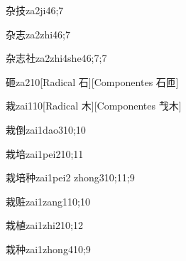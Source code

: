 
\begin{verbete}{杂技}{za2ji4}{6;7}
\end{verbete}

\begin{verbete}{杂志}{za2zhi4}{6;7}
\end{verbete}

\begin{verbete}{杂志社}{za2zhi4she4}{6;7;7}
\end{verbete}

\begin{verbete}{砸}{za2}{10}[Radical 石][Componentes 石匝]
\end{verbete}

\begin{verbete}{栽}{zai1}{10}[Radical 木][Componentes 𢦏木]
\end{verbete}

\begin{verbete}{栽倒}{zai1dao3}{10;10}
\end{verbete}

\begin{verbete}{栽培}{zai1pei2}{10;11}
\end{verbete}

\begin{verbete}{栽培种}{zai1pei2 zhong3}{10;11;9}
\end{verbete}

\begin{verbete}{栽赃}{zai1zang1}{10;10}
\end{verbete}

\begin{verbete}{栽植}{zai1zhi2}{10;12}
\end{verbete}

\begin{verbete}{栽种}{zai1zhong4}{10;9}
\end{verbete}

